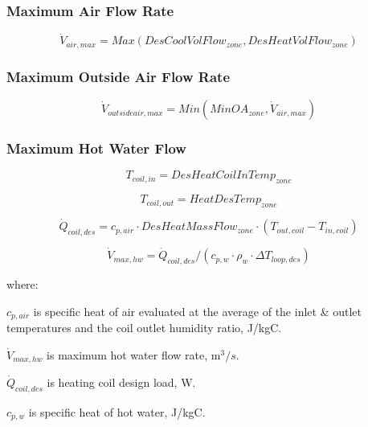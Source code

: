\subsubsection{Maximum Air Flow Rate}\label{maximum-air-flow-rate}

\begin{equation}
\dot V_{air,max} = Max(DesCoolVolFlow_{zone},DesHeatVolFlow_{zone})
\end{equation}

\subsubsection{Maximum Outside Air Flow Rate}\label{maximum-outside-air-flow-rate}

\begin{equation}
\dot V_{outsideair,max} = Min(MinOA_{zone},\dot V_{air,max})
\end{equation}

\subsubsection{Maximum Hot Water Flow}\label{maximum-hot-water-flow}

\begin{equation}
T_{coil,in} = DesHeatCoilInTemp_{zone}
\end{equation}

\begin{equation}
T_{coil,out} = HeatDesTemp_{zone}
\end{equation}

\begin{equation}
\dot{Q}_{coil,des} = c_{p,air} \cdot DesHeatMassFlow_{zone} \cdot (T_{out,coil} - T_{in,coil})
\end{equation}

\begin{equation}
\dot{V}_{max,hw} = \dot{Q}_{coil,des} / (c_{p,w} \cdot \rho_{w} \cdot \Delta T_{loop,des})
\end{equation}

where:

\(c_{p,air}\) is specific heat of air evaluated at the average of the inlet \& outlet temperatures and the coil outlet humidity ratio, J/kgC.

\(\dot{V}_{max,hw}\) is maximum hot water flow rate, m$^{3}/s$.

\(\dot{Q}_{coil,des}\) is heating coil design load, W.

\(c_{p,w}\) is specific heat of hot water, J/kgC.

